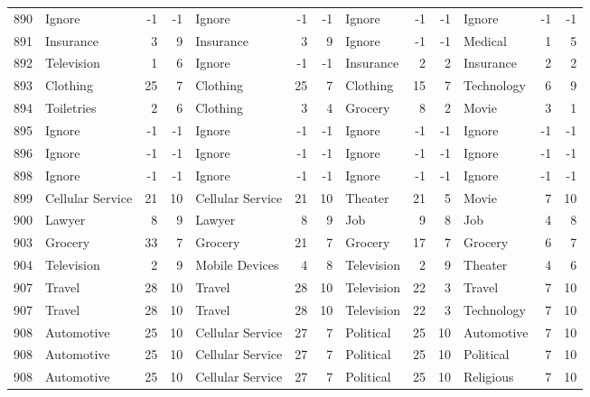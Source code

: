 \begin{figure}[htbp]
\begin{tabular}{rlrrlrrlrrlrr}
    890   & Ignore & -1    & -1    & Ignore & -1    & -1    & Ignore & -1    & -1    & Ignore & -1    & -1 \\
    891   & Insurance & 3     & 9     & Insurance & 3     & 9     & Ignore & -1    & -1    & Medical & 1     & 5 \\
    892   & Television & 1     & 6     & Ignore & -1    & -1    & Insurance & 2     & 2     & Insurance & 2     & 2 \\
    893   & Clothing & 25    & 7     & Clothing & 25    & 7     & Clothing & 15    & 7     & Technology & 6     & 9 \\
    894   & Toiletries & 2     & 6     & Clothing & 3     & 4     & Grocery & 8     & 2     & Movie & 3     & 1 \\
    895   & Ignore & -1    & -1    & Ignore & -1    & -1    & Ignore & -1    & -1    & Ignore & -1    & -1 \\
    896   & Ignore & -1    & -1    & Ignore & -1    & -1    & Ignore & -1    & -1    & Ignore & -1    & -1 \\
    898   & Ignore & -1    & -1    & Ignore & -1    & -1    & Ignore & -1    & -1    & Ignore & -1    & -1 \\
    899   & Cellular Service & 21    & 10    & Cellular Service & 21    & 10    & Theater & 21    & 5     & Movie & 7     & 10 \\
    900   & Lawyer & 8     & 9     & Lawyer & 8     & 9     & Job   & 9     & 8     & Job   & 4     & 8 \\
    903   & Grocery & 33    & 7     & Grocery & 21    & 7     & Grocery & 17    & 7     & Grocery & 6     & 7 \\
    904   & Television & 2     & 9     & Mobile Devices & 4     & 8     & Television & 2     & 9     & Theater & 4     & 6 \\
    907   & Travel & 28    & 10    & Travel & 28    & 10    & Television & 22    & 3     & Travel & 7     & 10 \\
    907   & Travel & 28    & 10    & Travel & 28    & 10    & Television & 22    & 3     & Technology & 7     & 10 \\
    908   & Automotive & 25    & 10    & Cellular Service & 27    & 7     & Political & 25    & 10    & Automotive & 7     & 10 \\
    908   & Automotive & 25    & 10    & Cellular Service & 27    & 7     & Political & 25    & 10    & Political & 7     & 10 \\
    908   & Automotive & 25    & 10    & Cellular Service & 27    & 7     & Political & 25    & 10    & Religious & 7     & 10 \\

\end{tabular}
\end{figure}
